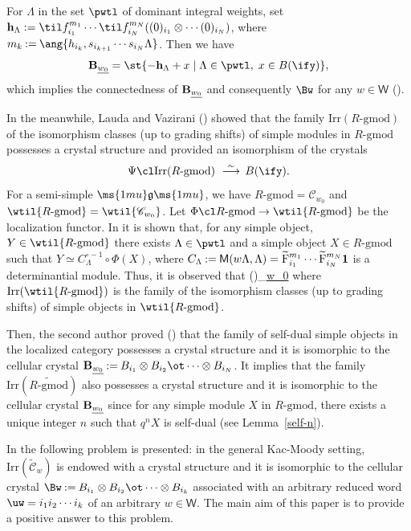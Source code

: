 \documentclass[12pt,leqno]{amsart}%
\theoremstyle{plain}
\theoremstyle{definition}
\newcommand{\seteq}{\mathbin{:=}}
\newcommand{\g}{\ms{1mu}\mathfrak{g}\ms{1mu}}
\newcommand{\gmod}{\text{-}\mathrm{gmod}}
\newcommand{\weyl}{\mathsf{W}}  %
\newcommand{\catC}{ \mathscr{C}}  	%
\newcommand{\dM}{ \mathsf{M }}              %
\newcommand{\tF}{\widetilde{\mathrm{F}}} 		%
\newcommand{\La}{\Lambda} 			%
\newcommand{\tC}{\widetilde{\catC}}
\newcommand{\Irr}{\mathrm{Irr}}
\numberwithin{equation}{section}
\begin{document}
For $\La$ in the set $\pwtl$ of dominant integral weights, set
${\bf h}_\La := \til f_{i_1}^{m_1} \cdots \til f_{i_N}^{m_N}((0)_{i_1} \otimes \cdots (0)_{i_N})$, where $m_k \seteq \ang{h_{i_k}, s_{i_{k+1}} \cdots s_{i_N} \La}$.
Then we have 
\[
{\bf B}_{\underline{w_0}}=\st{-{\bf h}_\La+x\mid \La\in\pwtl,\;x\in B(\ify)},
\]
which implies the connectedness of ${\bf B}_{\underline{w_0}}$ and consequently $\Bw$ for any $w \in \weyl$ (\cite{Kana-N}).

\medskip
 In the meanwhile,
 Lauda and Vazirani (\cite{LV11})  showed  that the family $\Irr(R\gmod)$
 of the isomorphism classes (up to grading shifts) 
of simple modules in $R\gmod$ possesses a
crystal structure and provided an isomorphism of  the crystals 
\[
\Psi\cl \Irr(R\gmod)\,\,\overset{\sim}{\longrightarrow}\, B(\ify).
\]
For a semi-simple $\g$, we have 
$R\gmod=\catC_{w_0}$ and $\wtil{R\gmod}=\wtil{\catC_{w_0}}$. 
Let $\Phi\cl R\gmod\to \wtil{R\gmod}$ be the localization functor. In \cite{KKOP21} it  is  shown that, for any simple object, 
$Y\in \wtil{R\gmod}$ there exists $\La\in\pwtl$ and a simple object $X\in R\gmod$
such that $Y\simeq C_\La^{\circ -1}\circ \Phi(X)$, where 
$C_\La\seteq\dM(w\La, \La)=\tF_{i_1}^{m_1}\cdots \tF_{i_N}^{m_N}{\bf 1}$ is a determinantial module. Thus, it is observed that 
\eqn
\Irr(\wtil{R\gmod})_{\underline{w_0}}\qt{
by $C_\La^{\circ -1}\circ X\longleftrightarrow -{\bf h}_\La+\Psi(X)$,}
\eneqn
\vspace{-1pt}where $\Irr(\wtil{R\gmod})$ is
the family of the isomorphism classes
(up to grading shifts) of simple objects in  $\wtil{R\gmod}$.


Then, the second author proved (\cite{N2}) that
the family of self-dual simple objects in 
the localized category possesses a crystal 
structure and it is isomorphic to the cellular crystal ${\bf B}_{\underline{w_0}}\seteq B_{i_1}\otimes B_{i_2}\ot\cdots\otimes B_{i_N}$. It implies that the family 
$\Irr(\widetilde{R\gmod})$ also possesses a crystal 
structure and it is isomorphic to the cellular crystal ${\bf B}_{\underline{w_0}}$ since for any simple module $X$ in $R\gmod$, there exists a unique integer $n$ 
such that $q^n X$ is self-dual (see Lemma~\ref{self-n}).

In \cite{N2}   the following problem is presented: in the general Kac-Moody setting, 
$\Irr(\tC_w)$  is endowed with 
a crystal structure and it is isomorphic to the cellular 
crystal $\Bw\seteq B_{i_1}\otimes B_{i_2}\ot\cdots\otimes B_{i_k}$ associated with an arbitrary reduced word $\uw=i_1i_2\cdots i_k$ of an arbitrary $w\in\weyl$. 
The main aim of this paper is to provide a positive answer to this problem.
\end{document}

